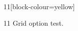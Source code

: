 \documentclass[paper=A4]{ropas-poster}
\begin{document}
\begin{postergrid}{1}{1}[block-colour=yellow]
\begin{posterblock}{1}{1}
Grid option test.
\end{posterblock}
\end{postergrid}
\end{document}
